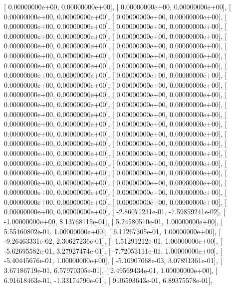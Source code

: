 \documentclass{article}
\begin{document}
       [  0.00000000e+00,   0.00000000e+00],
       [  0.00000000e+00,   0.00000000e+00],
       [  0.00000000e+00,   0.00000000e+00],
       [  0.00000000e+00,   0.00000000e+00],
       [  0.00000000e+00,   0.00000000e+00],
       [  0.00000000e+00,   0.00000000e+00],
       [  0.00000000e+00,   0.00000000e+00],
       [  0.00000000e+00,   0.00000000e+00],
       [  0.00000000e+00,   0.00000000e+00],
       [  0.00000000e+00,   0.00000000e+00],
       [  0.00000000e+00,   0.00000000e+00],
       [  0.00000000e+00,   0.00000000e+00],
       [  0.00000000e+00,   0.00000000e+00],
       [  0.00000000e+00,   0.00000000e+00],
       [  0.00000000e+00,   0.00000000e+00],
       [  0.00000000e+00,   0.00000000e+00],
       [  0.00000000e+00,   0.00000000e+00],
       [  0.00000000e+00,   0.00000000e+00],
       [  0.00000000e+00,   0.00000000e+00],
       [  0.00000000e+00,   0.00000000e+00],
       [  0.00000000e+00,   0.00000000e+00],
       [  0.00000000e+00,   0.00000000e+00],
       [  0.00000000e+00,   0.00000000e+00],
       [  0.00000000e+00,   0.00000000e+00],
       [  0.00000000e+00,   0.00000000e+00],
       [  0.00000000e+00,   0.00000000e+00],
       [  0.00000000e+00,   0.00000000e+00],
       [  0.00000000e+00,   0.00000000e+00],
       [  0.00000000e+00,   0.00000000e+00],
       [  0.00000000e+00,   0.00000000e+00],
       [  0.00000000e+00,   0.00000000e+00],
       [  0.00000000e+00,   0.00000000e+00],
       [  0.00000000e+00,   0.00000000e+00],
       [  0.00000000e+00,   0.00000000e+00],
       [  0.00000000e+00,   0.00000000e+00],
       [  0.00000000e+00,   0.00000000e+00],
       [  0.00000000e+00,   0.00000000e+00],
       [  0.00000000e+00,   0.00000000e+00],
       [  0.00000000e+00,   0.00000000e+00],
       [  0.00000000e+00,   0.00000000e+00],
       [  0.00000000e+00,   0.00000000e+00],
       [  0.00000000e+00,   0.00000000e+00],
       [  0.00000000e+00,   0.00000000e+00],
       [ -2.86071231e-01,  -7.59859241e-02],
       [ -1.00000000e+00,   8.13768115e-01],
       [  5.24580510e-01,   1.00000000e+00],
       [  5.55460802e-01,   1.00000000e+00],
       [  6.11267305e-01,   1.00000000e+00],
       [ -9.26463331e-02,   2.30627236e-01],
       [ -1.51291212e-01,   1.00000000e+00],
       [ -5.62695582e-01,   3.27927474e-01],
       [ -7.72053111e-01,   1.00000000e+00],
       [ -5.40445676e-01,   1.00000000e+00],
       [ -5.10907068e-03,   3.07891361e-01],
       [  3.67186719e-01,   6.57970305e-01],
       [  2.49569434e-01,   1.00000000e+00],
       [  6.91618463e-01,  -1.33174790e-01],
       [  9.36593643e-01,   6.89375578e-01],
\end{document}
